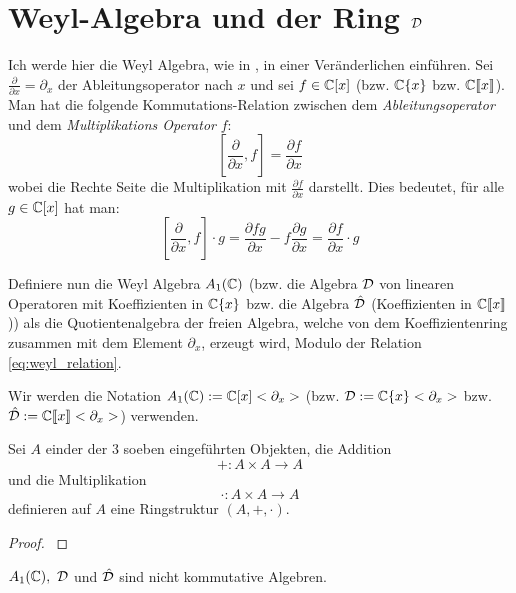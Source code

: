\section{Weyl-Algebra und der Ring $\mathcal{D}$} 
Ich werde hier die Weyl Algebra, wie in
\cite[Chapter~1]{sabbah_cimpa90}, in einer Veränderlichen einführen.
Sei $\frac{\partial}{\partial x}=\partial_x$ der Ableitungsoperator nach $x$
und sei $f \in\mathbb{C}[x]$ (bzw. $\mathbb{C}\{x\}$ bzw. $\mathbb{C}\llbracket x\rrbracket$).
Man hat die folgende Kommutations-Relation zwischen dem
\emph{Ableitungsoperator}
und dem \emph{Multiplikations Operator} $f$:
\begin{equation}\label{eq:weyl_relation}
  [\frac{\partial}{\partial x},f]=\frac{\partial f}{\partial x}
\end{equation}
wobei die Rechte Seite die Multiplikation mit $\frac{\partial f}{\partial x}$
darstellt. Dies bedeutet, für alle $g\in\mathbb{C}[x]$ hat man:
\[
  [\frac{\partial}{\partial x},f]\cdot g
  =\frac{\partial fg}{\partial x} - f\frac{\partial g}{\partial x}
  =\frac{\partial f}{\partial x} \cdot g
\]
\begin{defn}
  Definiere nun die Weyl Algebra $A_1(\mathbb{C})$ (bzw. die Algebra $\mathcal{D}$ von
  linearen Operatoren mit Koeffizienten in $\mathbb{C}\{x\}$ bzw. die Algebra
  $\hat{\mathcal{D}}$ (Koeffizienten in $\mathbb{C}\llbracket x\rrbracket$)) als die
  Quotientenalgebra der freien Algebra, welche von dem Koeffizientenring
  zusammen mit dem Element $\partial_x$, erzeugt wird, Modulo der Relation
  \eqref{eq:weyl_relation}.
\end{defn}
Wir werden die Notation $A_1(\mathbb{C}):=\mathbb{C}[x]<\partial_x>$ (bzw.
$\mathcal{D}:=\mathbb{C}\{x\}<\partial_x>$ bzw. 
$\hat{\mathcal{D}}:=\mathbb{C}\llbracket x\rrbracket<\partial_x>$) verwenden.

\begin{lem} %
  Sei $A$ einder der 3 soeben eingeführten Objekten, die Addition 
  \[
    +:A\times A \rightarrow A
  \]
  und die Multiplikation
  \[
    \cdot:A\times A \rightarrow A
  \]
  definieren auf $A$ eine Ringstruktur $(A,+,\cdot)$.
\end{lem}
\begin{proof}
  \cite[Kapittel 2 Section 1]{ZulaBarbara}
\end{proof}

\begin{rem}
  $A_1(\mathbb{C}),~\mathcal{D}$ und $\hat{\mathcal{D}}$ sind nicht kommutative Algebren.
\end{rem}

